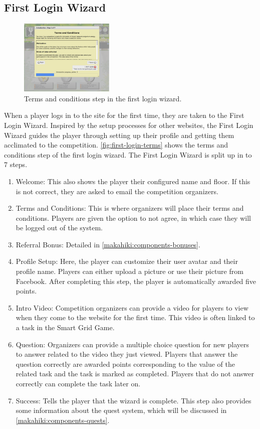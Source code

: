 \subsection{First Login Wizard}
\label{makahiki:components-setup}

\begin{figure}[h]
  \center
  \includegraphics[width=0.4\textwidth]{images/first-login-terms.eps}
  \caption{Terms and conditions step in the first login wizard.}
  \label{fig:first-login-terms}
\end{figure}

When a player logs in to the site for the first time, they are taken to the First Login Wizard. Inspired by the setup processes for other websites, the First Login Wizard guides the player through setting up their profile and getting them acclimated to the competition. \autoref{fig:first-login-terms} shows the terms and conditions step of the first login wizard. The First Login Wizard is split up in to 7 steps.

\begin{enumerate}
    \item Welcome: This also shows the player their configured name and floor. If this is not correct, they are asked to email the competition organizers.
    \item Terms and Conditions: This is where organizers will place their terms and conditions. Players are given the option to not agree, in which case they will be logged out of the system.
    \item Referral Bonus: Detailed in \autoref{makahiki:components-bonuses}.
    \item Profile Setup: Here, the player can customize their user avatar and their profile name. Players can either upload a picture or use their picture from Facebook. After completing this step, the player is automatically awarded five points.
    \item Intro Video: Competition organizers can provide a video for players to view when they come to the website for the first time. This video is often linked to a task in the Smart Grid Game.
    \item Question: Organizers can provide a multiple choice question for new players to answer related to the video they just viewed. Players that answer the question correctly are awarded points corresponding to the value of the related task and the task is marked as completed. Players that do not answer correctly can complete the task later on.
    \item Success: Tells the player that the wizard is complete. This step also provides some information about the quest system, which will be discussed in \autoref{makahiki:components-quests}.
\end{enumerate}

